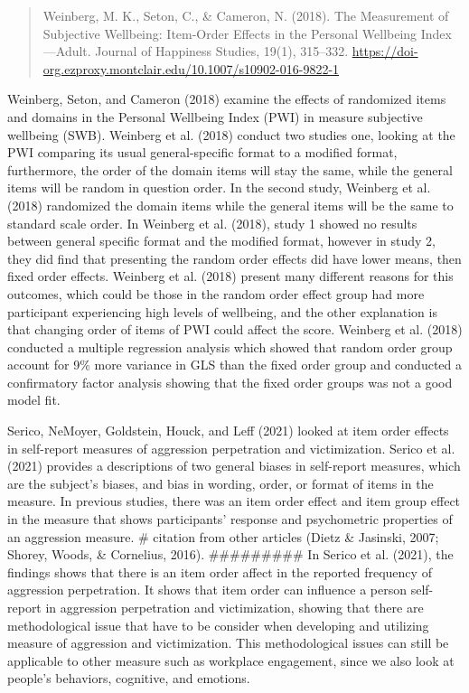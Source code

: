 \documentclass[
  man]{apa6}
\begin{document}
\begin{quote}
Weinberg, M. K., Seton, C., \& Cameron, N. (2018). The Measurement of Subjective Wellbeing: Item-Order Effects in the Personal Wellbeing Index---Adult. Journal of Happiness Studies, 19(1), 315--332. \url{https://doi-org.ezproxy.montclair.edu/10.1007/s10902-016-9822-1}
\end{quote}

Weinberg, Seton, and Cameron (2018) examine the effects of randomized items and domains in the Personal Wellbeing Index (PWI) in measure subjective wellbeing (SWB). Weinberg et al. (2018) conduct two studies one, looking at the PWI comparing its usual general-specific format to a modified format, furthermore, the order of the domain items will stay the same, while the general items will be random in question order. In the second study, Weinberg et al. (2018) randomized the domain items while the general items will be the same to standard scale order. In Weinberg et al. (2018), study 1 showed no results between general specific format and the modified format, however in study 2, they did find that presenting the random order effects did have lower means, then fixed order effects. Weinberg et al. (2018) present many different reasons for this outcomes, which could be those in the random order effect group had more participant experiencing high levels of wellbeing, and the other explanation is that changing order of items of PWI could affect the score. Weinberg et al. (2018) conducted a multiple regression analysis which showed that random order group account for 9\% more variance in GLS than the fixed order group and conducted a confirmatory factor analysis showing that the fixed order groups was not a good model fit.

Serico, NeMoyer, Goldstein, Houck, and Leff (2021) looked at item order effects in self-report measures of aggression perpetration and victimization. Serico et al. (2021) provides a descriptions of two general biases in self-report measures, which are the subject's biases, and bias in wording, order, or format of items in the measure. In previous studies, there was an item order effect and item group effect in the measure that shows participants' response and psychometric properties of an aggression measure. \# citation from other articles (Dietz \& Jasinski, 2007; Shorey, Woods, \& Cornelius, 2016). \#\#\#\#\#\#\#\#\# In Serico et al. (2021), the findings shows that there is an item order affect in the reported frequency of aggression perpetration. It shows that item order can influence a person self-report in aggression perpetration and victimization, showing that there are methodological issue that have to be consider when developing and utilizing measure of aggression and victimization. This methodological issues can still be applicable to other measure such as workplace engagement, since we also look at people's behaviors, cognitive, and emotions.
\end{document}

